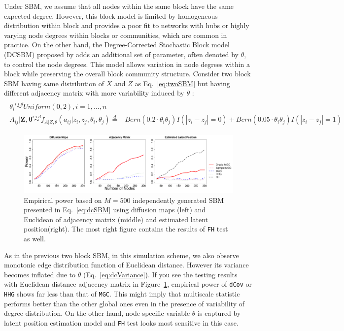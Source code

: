 \documentclass[12pt]{article}
\theoremstyle{definition}
\begin{document}
Under SBM, we assume that all nodes within the same block have the same expected degree. However, this block model is limited by homogeneous distribution within block and provides a poor fit to networks with hubs or highly varying node degrees within blocks or communities, which are common in practice. On the other hand, the Degree-Corrected Stochastic Block model (DCSBM) proposed by \cite{karrer2011stochastic} adds an additional set of parameter, often denoted by $\theta$, to control the node degrees. This model allows variation in node degrees within a block while preserving the overall block community structure. Consider two block SBM having same distribution of $X$ and $Z$ as Eq.~\ref{eq:twoSBM} but having different adjacency matrix with more variability induced by $\theta$ : 
\begin{equation}
\label{eq:dcSBM}
\begin{gathered}
\begin{split}
\theta_{i} \overset{i.i.d}{\sim} Uniform(0,2), i = 1, \ldots, n \\ 
A_{ij} | \mathbf{Z}, \mathbf{\theta}   \overset{i.i.d}{\sim}   f_{A|Z, \theta}(a_{ij} | z_{i}, z_{j}, \theta_{i}, \theta_{j}) \stackrel{d}{=} & Bern(0.2 \cdot \theta_{i}\theta_{j}) I ( |z_{i} - z_{j}| = 0 )  + Bern(0.05 \cdot \theta_{i} \theta_{j} ) I(|z_{i} - z_{j}| = 1) 
\end{split}
\end{gathered}
\end{equation}

\begin{figure}[H]
	\centering
	\includegraphics[width=7in]{../Figure/dcSBM.pdf}
	\caption{Empirical power based on $M = 500$ independently generated SBM presented in Eq.~\ref{eq:dcSBM} using diffusion maps (left) and Euclidean of adjacency matrix (middle)  and estimated latent position(right). The most right figure contains the results of \texttt{FH} test as well.}
		\label{fig:dcSBM}
\end{figure}	

As in the previous two block SBM, in this simulation scheme, we also observe monotonic edge distribution function of Euclidean distance. However its variance becomes inflated due to $\theta$ (Eq.~\ref{eq:dcVariance}). If you see the testing results with Euclidean distance adjacency matrix in Figure~\ref{fig:dcSBM}, empirical power of \texttt{dCov} or \texttt{HHG} shows far less than that of \texttt{MGC}. This might imply that multiscale statistic performs better than the other global ones even in the presence of variability of degree distribution. On the other hand, node-specific variable $\theta$ is captured by latent position estimation model \citep{fosdick2015testing} and \texttt{FH} test looks most sensitive in this case.  
	
\end{document}
